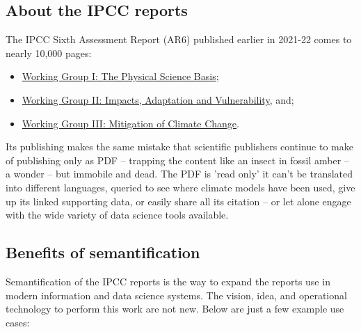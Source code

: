 \documentclass{article}
\begin{document}
\subsection{About the IPCC reports}\label{H2780836}



The IPCC Sixth Assessment Report (AR6) published earlier in 2021-22 comes to nearly 10,000 pages:

\begin{itemize}
\item \href{https://www.ipcc.ch/report/ar6/wg1/}{Working Group I: The Physical Science Basis}; 


\item \href{https://www.ipcc.ch/report/ar6/wg2/}{Working Group II: Impacts, Adaptation and Vulnerability}, and; 


\item \href{https://www.ipcc.ch/report/ar6/wg3/}{Working Group III: Mitigation of Climate Change}. 


\end{itemize}

Its publishing makes the same mistake that scientific publishers continue to make of publishing only as PDF – trapping the content like an insect in fossil amber – a wonder – but immobile and dead. The PDF is 'read only' it can't be translated into different languages, queried to see where climate models have been used, give up its linked supporting data, or easily share all its citation – or let alone engage with the wide variety of data science tools available.


\subsection{Benefits of semantification}\label{H8935051}



Semantification of the IPCC reports is the way to expand the reports use in modern information and data science systems. The vision, idea, and operational technology to perform this work are not new. Below are just a few example use cases: 
\end{document}
